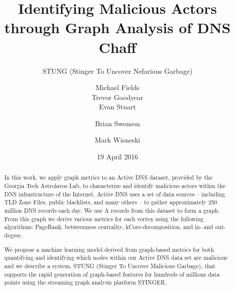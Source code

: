\documentclass{acm_proc_article-sp}
\begin{document}

\title{Identifying Malicious Actors through Graph Analysis of DNS Chaff}
\subtitle{ STUNG (Stinger To Uncover Nefarious Garbage)}

\author{
\alignauthor
Michael Fields\\
\alignauthor
Trevor Goodyear\\
\alignauthor
Evan Stuart\\
\and %
\alignauthor
Brian Swenson\\
\and %
\alignauthor
Mark Wisneski\\
}

\date{19 April 2016}


\maketitle
\begin{abstract}
In this work, we apply graph metrics to an Active DNS dataset, provided by the Georgia Tech Astrolavos Lab, to characterize and identify malicious actors within the DNS infrastructure of the Internet. Active DNS uses a set of data sources -- including TLD Zone Files, public blacklists, and many others -- to gather approximately 250 million DNS records each day. We use A records from this dataset to form a graph. From this graph we derive various metrics for each vertex using the following algorithms: PageRank, betweenness centrality, kCore-decomposition, and in- and out-degree.

We propose a machine learning model derived from graph-based metrics for both quantifying and identifying which nodes within our Active DNS data set are malicious and we describe a system, STUNG (Stinger To Uncover Malicious Garbage), that supports the rapid generation of graph-based features for hundreds of millions data points using the streaming graph analysis platform STINGER.
\end{abstract}
\end{document}
